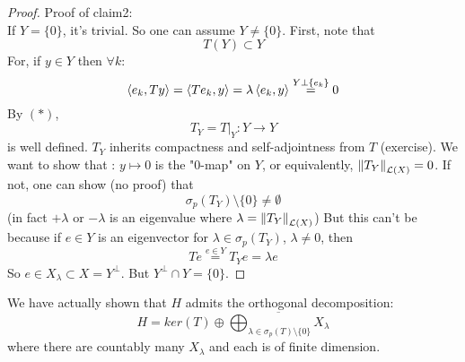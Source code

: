 \documentclass{article}
\begin{document}
\begin{proof}
	Proof of claim2:\\
	If $Y=\{0\}$, it's trivial. So one can assume $Y\neq\{0\}$. First, note that
	\begin{equation}T(Y)\subset Y\tag{$*$}\end{equation}
	For, if $y\in Y$ then $\forall k$:
	\[\left<{e_k},{Ty}\right>=\left<{Te_k},{y}\right>=\lambda\left<{e_k},{y}\right>\stackrel{Y\perp\{e_k\}}{=}0\]
	By $(*)$,
	\[T_Y=T|_Y:Y\to Y\] is well defined. $T_Y$ inherits compactness and self-adjointness from $T$ (exercise). We want to show that : $y\mapsto0 $ is the  "0-map" on $Y$, or equivalently, $\left\|{T_Y}\right\|_{\mathcal{L}(X)}=0$. If not, one can show (no proof) that
	\[\sigma_p(T_Y)\setminus\{0\}\neq\emptyset\]
	(in fact $+\lambda$ or $-\lambda$ is an eigenvalue where $\lambda=\left\|{T_Y}\right\|_{\mathcal{L}(X)}$) But this can't be because if $e\in Y$ is an eigenvector for $\lambda\in \sigma_p(T_Y)$, $\lambda\neq 0$, then
	\[Te\stackrel{e\in Y}{=}T_Y e=\lambda e\]
	So $e\in X_\lambda\subset X=Y^\perp$. But $Y^\perp\cap Y=\{0\}$.
\end{proof}
\begin{remark}
	We have actually shown that $H$ admits the orthogonal decomposition:
	\[H=ker(T)\oplus
		\overline{\bigoplus_{\lambda\in\sigma_p(T)\setminus\{0\}}X_\lambda}
	\]
	where there are countably many $X_\lambda$ and each is of finite dimension.
\end{remark}
\end{document}
